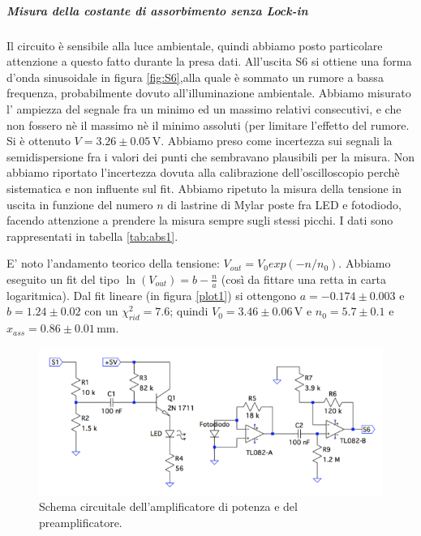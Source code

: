 \documentclass[10pt,a4paper]{article}
\begin{document}
\subparagraph{Misura della costante di assorbimento senza Lock-in}
Il circuito è sensibile alla luce ambientale, quindi abbiamo posto particolare attenzione a questo fatto durante la presa dati. %
All'uscita S6 si ottiene una forma d'onda sinusoidale in figura \ref{fig:S6},alla quale è sommato un rumore a bassa frequenza, probabilmente dovuto all'illuminazione ambientale. Abbiamo misurato l' ampiezza del segnale fra un minimo ed un massimo relativi consecutivi, e che non fossero nè il massimo nè il minimo assoluti (per limitare l'effetto del rumore. Si è ottenuto $V=3.26\pm0.05\,\mbox{V}$.%
Abbiamo preso come incertezza sui segnali la semidispersione fra i valori dei punti che sembravano plausibili per la misura.
Non abbiamo riportato l'incertezza dovuta alla  calibrazione dell'oscilloscopio perchè sistematica e non influente sul fit.
Abbiamo ripetuto la misura della tensione in uscita in funzione del numero $n$ di lastrine di Mylar poste fra LED e fotodiodo, facendo attenzione a prendere   la misura sempre sugli stessi picchi. I dati sono rappresentati in tabella \ref{tab:abs1}. 

E' noto l'andamento teorico della tensione: $V_{out}=V_0 exp(-n/n_0)$. Abbiamo eseguito un fit del tipo $\ln(V_{out})=b-\frac{n}{a}$ (così da fittare una retta in carta logaritmica). %
Dal fit lineare (in figura \ref{plot1}) si ottengono $a=-0.174\pm0.003$ e $b=1.24\pm0.02$ con un $\chi^2_{rid}=7.6$; quindi $V_0= 3.46\pm0.06\,\mbox{V}$ e $n_0=5.7\pm0.1$ e $x_{ass}=0.86\pm0.01\,\mbox{mm}$.


\begin{figure}[!htb]
  \centering
  \includegraphics[scale=0.75]{ampli-preampli.png}
\caption{Schema circuitale dell'amplificatore di potenza e del preamplificatore.\label{fig:ampli-preampli}}
\end{figure}
\end{document}
